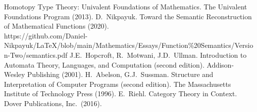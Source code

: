 \documentclass[twoside]{article}
\begin{document}
\newpage

\begin{thebibliography}{99}
 Homotopy Type Theory: Univalent Foundations of Mathematics. The Univalent Foundations Program (2013). 
 D.~Nikpayuk. Toward the Semantic Reconstruction of Mathematical Functions (2020).\\
    https://github.com/Daniel-Nikpayuk/LaTeX/blob/main/Mathematics/Essays/Function\%20Semantics/Version-Two/semantics.pdf
 J.E.~Hopcroft, R.~Motwani, J.D.~Ullman. Introduction to Automata Theory, Languages, and Computation
               (second edition). Addison-Wesley Publishing (2001).
 H.~Abelson, G.J.~Sussman. Structure and Interpretation of Computer Programs (second edition).
               The Massachusetts Institute of Technology Press (1996).
 E.~Riehl. Category Theory in Context. Dover Publications, Inc.~(2016).
\end{thebibliography}
\end{document}
